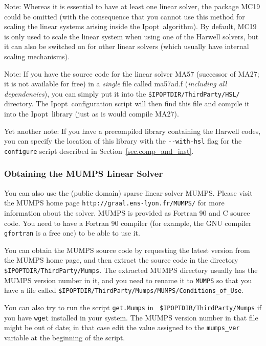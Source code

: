 \documentclass[10pt]{article}
\newcommand{\Ipopt}{{\sc Ipopt}}
\begin{document}
Note: Whereas it is essential to have at least one linear solver, the
package MC19 could be omitted (with the consequence that you cannot
use this method for scaling the linear systems arising inside the
\Ipopt\ algorithm).  By default, MC19 is only used to scale the linear
system when using one of the Harwell solvers, but it can also be
switched on for other linear solvers (which usually have internal
scaling mechanisms).

Note: If you have the source code for the linear solver MA57
(successor of MA27; it is not available for free) in a \emph{single}
file called ma57ad.f (\emph{including all dependencies}), you can
simply put it into the {\tt \$IPOPTDIR/ThirdParty/HSL/} directory.
The \Ipopt\ configuration script will then find this file and compile
it into the \Ipopt\ library (just as is would compile MA27).

Yet another note: If you have a precompiled library containing the
Harwell codes, you can specify the location of this library with the
\verb|--with-hsl| flag for the {\tt configure} script described in
Section~\ref{sec.comp_and_inst}.

\subsubsection{Obtaining the MUMPS Linear Solver}\label{sec:MUMPS}

You can also use the (public domain) sparse linear solver MUMPS.
Please visit the MUMPS home page {\tt http://graal.ens-lyon.fr/MUMPS/}
for more information about the solver. MUMPS is provided as Fortran 90
and C source code.  You need to have a Fortran 90 compiler (for
example, the GNU compiler {\tt gfortran} is a free one) to be able to
use it.

You can obtain the MUMPS source code by requesting the latest version
from the MUMPS home page, and then extract the source code in the
directory {\tt \$IPOPTDIR/ThirdParty/Mumps}.  The extracted MUMPS
directory usually has the MUMPS version number in it, and you need to
rename it to {\tt MUMPS} so that you have a file called
{\tt \$IPOPTDIR/ThirdParty/Mumps/MUMPS/Conditions\_of\_Use}.

You can also try to run the script {\tt get.Mumps} in {\tt
  \$IPOPTDIR/ThirdParty/Mumps} if you have {\tt wget} installed in
your system.  The MUMPS version number in that file might be out of
date; in that case edit the value assigned to the {\tt mumps\_ver}
variable at the beginning of the script.
\end{document}
